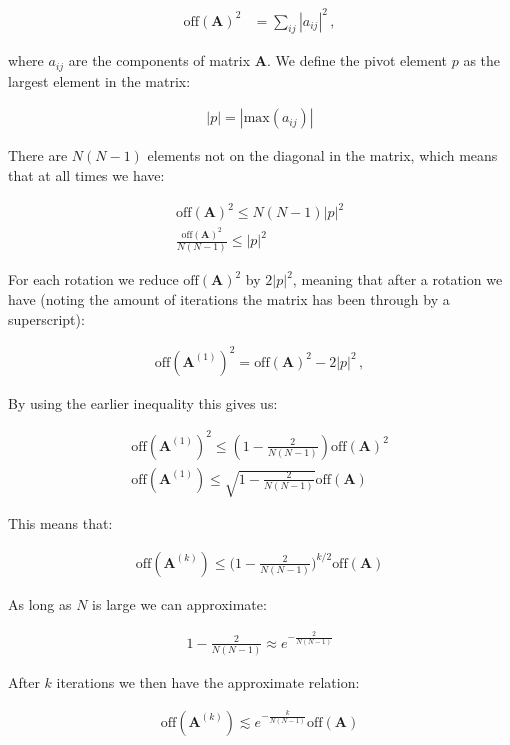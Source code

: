 \documentclass[reprint,english,notitlepage]{revtex4-1}  %
\begin{document}
\begin{align*}
\text{off}(\textbf{A})^2 &= \sum\limits_{ij} |a_{ij}|^2 \, ,
\end{align*}

where $a_{ij}$ are the components of matrix \textbf{A}. We define the pivot element $p$ as the largest element in the matrix:

\begin{align*}
|p| = |\text{max}(a_{ij})|
\end{align*}

There are $N(N-1)$ elements not on the diagonal in the matrix, which means that at all times we have:

\begin{align*}
\text{off}(\textbf{A})^2 \leq N(N-1)|p|^2 \\
\frac{\text{off}(\textbf{A})^2}{N(N-1)} \leq |p|^2
\end{align*}

For each rotation we reduce $\text{off}(\textbf{A})^2$ by $2|p|^2$, meaning that after a rotation we have (noting the amount of iterations the matrix has been through by a superscript):

\begin{align*}
\text{off}(\textbf{A}^{(1)})^2 = \text{off}(\textbf{A})^2 - 2|p|^2 \, ,
\end{align*}

By using the earlier inequality this gives us:

\begin{align*}
\text{off}(\textbf{A}^{(1)})^2 \leq (1 - \frac{2}{N(N-1)}) \text{off}(\textbf{A})^2 \\
\text{off}(\textbf{A}^{(1)}) \leq \sqrt{1 - \frac{2}{N(N-1)}} \text{off}(\textbf{A})
\end{align*}

This means that:

\begin{align*}
\text{off}(\textbf{A}^{(k)}) \leq \bigg(1 - \frac{2}{N(N-1)}\bigg)^{k/2} \text{off}(\textbf{A})
\end{align*}

As long as $N$ is large we can approximate:

\begin{align*}
1 - \frac{2}{N(N-1)} \approx e^{-\frac{2}{N(N-1)}}
\end{align*}

After $k$ iterations we then have the approximate relation:

\begin{align*}
\text{off}(\textbf{A}^{(k)}) \lesssim e^{-\frac{k}{N(N-1)}} \text{off}(\textbf{A})
\end{align*}
\end{document}
